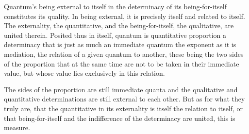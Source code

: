 Quantum's being external to itself in the determinacy of
its being-for-itself constitutes its quality.
In being external, it is precisely itself and related to itself.
The externality, the quantitative,
and the being-for-itself, the qualitative,
are united therein.
Posited thus in itself, quantum is quantitative proportion
a determinacy that is just as much an immediate quantum
the exponent as it is mediation,
the relation  of a given quantum to another,
these being the two sides of the proportion
that at the same time are not to be taken
in their immediate value,
but whose value lies exclusively in this relation.

The sides of the proportion are still immediate quanta
and the qualitative and quantitative determinations are
still external to each other.
But as for what they truly are,
that the quantitative in its externality is
itself the relation to itself,
or that being-for-itself and the indifference
of the determinacy are united,
this is measure.

